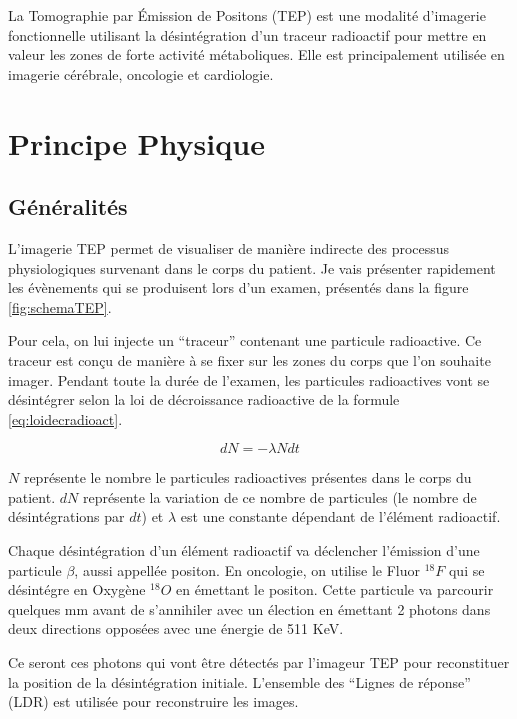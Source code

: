 \label{lab:chapPET}
La Tomographie par \'Emission de Positons (TEP) est une modalité d'imagerie fonctionnelle utilisant la désintégration d'un traceur radioactif pour mettre en valeur les zones de forte activité métaboliques. Elle est principalement utilisée en imagerie cérébrale, oncologie et cardiologie.

\chapter{Principe Physique}

	\section{Généralités}

L'imagerie TEP permet de visualiser de manière indirecte des processus physiologiques survenant dans le corps du patient. Je vais présenter rapidement les évènements qui se produisent lors d'un examen, présentés dans la figure \ref{fig:schemaTEP}.


Pour cela, on lui injecte un ``traceur'' contenant une particule radioactive. Ce traceur est conçu de manière à se fixer sur les zones du corps que l'on souhaite imager. Pendant toute la durée de l'examen, les particules radioactives vont se désintégrer selon la loi de décroissance radioactive de la formule \ref{eq:loidecradioact}.

\begin{equation}
	dN = - \lambda N dt
	\label{eq:loidecradioact}
\end{equation}

$N$ représente le nombre le particules radioactives présentes dans le corps du patient. $dN$ représente la variation de ce nombre de particules (le nombre de désintégrations par $dt$) et $\lambda$ est une constante dépendant de l'élément radioactif.

Chaque désintégration d'un élément radioactif va déclencher l'émission d'une particule $\beta$, aussi appellée positon. En oncologie, on utilise le Fluor $^{18}F$ qui se désintégre en Oxygène $^{18}O$ en émettant le positon. Cette particule va parcourir quelques mm avant de s'annihiler avec un élection en émettant 2 photons dans deux directions opposées avec une énergie de 511 KeV.

Ce seront ces photons qui vont être détectés par l'imageur TEP pour reconstituer la position de la désintégration initiale. L'ensemble des ``Lignes de réponse'' (LDR) est utilisée pour reconstruire les images.

